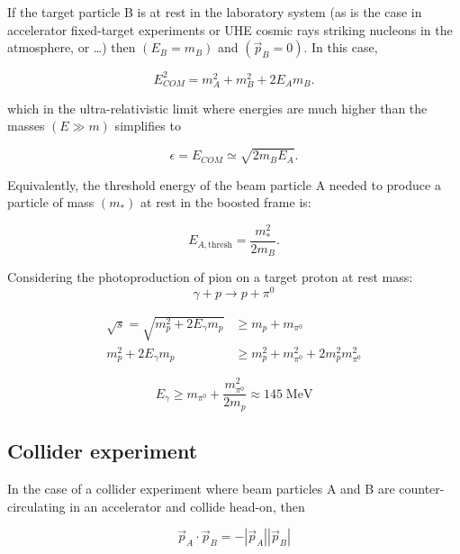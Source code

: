 \documentclass[
  letterpaper,
  DIV=11,
  numbers=noendperiod]{scrreprt}
\begin{document}
If the target particle B is at rest in the laboratory system (as is the
case in accelerator fixed-target experiments or UHE cosmic rays striking
nucleons in the atmosphere, or \ldots) then \((E_B = m_B)\) and
\((\vec{p}_B = 0)\). In this case,

\[E_{COM}^2 = m_A^2 + m_B^2 + 2E_Am_B.\]

which in the ultra-relativistic limit where energies are much higher
than the masses \((E \gg m)\) simplifies to

\[\epsilon = E_{COM} \simeq \sqrt{2m_BE_A}.\]

Equivalently, the threshold energy of the beam particle A needed to
produce a particle of mass \((m_*)\) at rest in the boosted frame is:

\[E_{A,\mathrm{thresh}} = \frac{m_*^2}{2m_B}.\]

\begin{tcolorbox}[enhanced jigsaw, colframe=quarto-callout-tip-color-frame, leftrule=.75mm, left=2mm, opacitybacktitle=0.6, colbacktitle=quarto-callout-tip-color!10!white, coltitle=black, arc=.35mm, titlerule=0mm, toprule=.15mm, opacityback=0, bottomrule=.15mm, breakable, bottomtitle=1mm, rightrule=.15mm, toptitle=1mm, colback=white, title=\textcolor{quarto-callout-tip-color}{\faLightbulb}\hspace{0.5em}{Example 1: Pion production}]

Considering the photoproduction of pion on a target proton at rest mass:
\[\gamma + p \rightarrow p + \pi^0\]

\[\begin{alignedat}{2}
 \sqrt{s} = \sqrt{m_p^2 + 2E_\gamma m_p} &\geq m_p + m_{\pi^0}\\
m_p^2 + 2 E_\gamma m_p &\geq m_p^2 + m^2_{\pi^0} + 2 m_p^2 m^2_{\pi^0}
\end{alignedat}\]

\[E_\gamma \geq m_{\pi^0} + \frac{m^2_{\pi^0}}{2 m_p} \approx 145 \mathrm{ \; MeV}\]

\end{tcolorbox}

\subsection{Collider experiment}\label{collider-experiment}

In the case of a collider experiment where beam particles A and B are
counter-circulating in an accelerator and collide head-on, then

\[{\vec p}_{A}\cdot{\vec p}_{B} = -|{\vec p}_{A}||{\vec p}_{B}|\]
\end{document}

